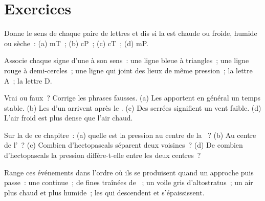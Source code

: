 \section{Exercices}

\begin{exercise}[$\star$]\label{exo:g8:fronts-and-weather-maps:1}
Donne le sens de chaque paire de lettres et dis si la  est
chaude ou froide, humide ou sèche~: (a) mT~; (b) cP~; (c) cT~; (d) mP.
\end{exercise}

\begin{exercise}[$\star$]\label{exo:g8:fronts-and-weather-maps:2}
Associe chaque signe d'une   à son sens~: une ligne
bleue à triangles~; une ligne rouge à demi-cercles~; une ligne qui joint
des lieux de même pression~; la lettre A~; la lettre D.
\end{exercise}

\begin{exercise}[$\star$]\label{exo:g8:fronts-and-weather-maps:3}
Vrai ou faux~? Corrige les phrases fausses. (a) Les  apportent
en général un temps stable. (b) Les  d'un  arrivent après
le . (c) Des  serrées signifient un vent faible. (d) L'air
froid est plus dense que l'air chaud.
\end{exercise}

\begin{exercise}[$\star$]\label{exo:g8:fronts-and-weather-maps:4}
Sur la   de ce chapitre~: (a) quelle est la pression au
centre de la ~? (b) Au centre de l'~? (c) Combien
d'hectopascals séparent deux  voisines~? (d) De combien
d'hectopascals la pression diffère-t-elle entre les deux centres~?
\end{exercise}

\begin{exercise}[$\star\star$]\label{exo:g8:fronts-and-weather-maps:5}
Range ces événements dans l'ordre où ils se produisent quand un  approche puis passe~: une  continue~; de fines traînées de
~; un voile gris d'altostratus~; un air plus chaud et plus humide~;
les  qui descendent et s'épaississent.
\end{exercise}

